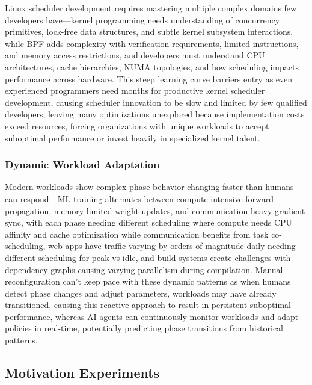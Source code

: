Linux scheduler development requires mastering multiple complex domains few developers have—kernel programming needs understanding of concurrency primitives, lock-free data structures, and subtle kernel subsystem interactions, while BPF adds complexity with verification requirements, limited instructions, and memory access restrictions, and developers must understand CPU architectures, cache hierarchies, NUMA topologies, and how scheduling impacts performance across hardware. This steep learning curve barriers entry as even experienced programmers need months for productive kernel scheduler development, causing scheduler innovation to be slow and limited by few qualified developers, leaving many optimizations unexplored because implementation costs exceed resources, forcing organizations with unique workloads to accept suboptimal performance or invest heavily in specialized kernel talent.

\subsubsection{Dynamic Workload Adaptation}

Modern workloads show complex phase behavior changing faster than humans can respond—ML training alternates between compute-intensive forward propagation, memory-limited weight updates, and communication-heavy gradient sync, with each phase needing different scheduling where compute needs CPU affinity and cache optimization while communication benefits from task co-scheduling, web apps have traffic varying by orders of magnitude daily needing different scheduling for peak vs idle, and build systems create challenges with dependency graphs causing varying parallelism during compilation. Manual reconfiguration can't keep pace with these dynamic patterns as when humans detect phase changes and adjust parameters, workloads may have already transitioned, causing this reactive approach to result in persistent suboptimal performance, whereas AI agents can continuously monitor workloads and adapt policies in real-time, potentially predicting phase transitions from historical patterns.

\subsection{Motivation Experiments}

